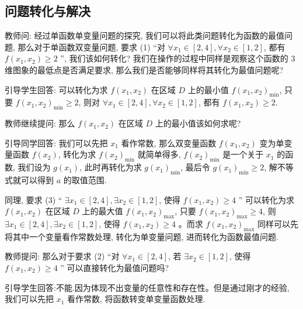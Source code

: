 \subsection{问题转化与解决}
教师问: 经过单函数单变量问题的探究, 我们可以将此类问题转化为函数的最值问题, 那么对于单函数双变量问题, 要求 (1) “对 \(\forall {x}_{1} \in  \left\lbrack  {2, 4}\right\rbrack  , \forall {x}_{2} \in  \left\lbrack  {1, 2}\right\rbrack\), 都有 \(f(x_1, x_2)  \geq  2\) ”, 我们该如何转化? 我们在操作的过程中同样是观察这个函数的 3 维图象的最低点是否满足要求, 那么我们是否能够同样将其转化为最值问题呢?

引导学生回答: 可以转化为求 \(f(x_1, x_2)\) 在区域 \(D\) 上的最小值 \(f{\left( {x}_{1}, {x}_{2}\right) }_{\min }\), 只要 \(f{\left( {x}_{1}, {x}_{2}\right) }_{\min } \geq  2\), 则对 \(\forall {x}_{1} \in  \left\lbrack  {2, 4}\right\rbrack  , \forall {x}_{2} \in  \left\lbrack  {1, 2}\right\rbrack\), 都有 \(f(x_1, x_2)  \geq  2\).

教师继续提问: 那么 \(f(x_1, x_2)\) 在区域 \(D\) 上的最小值该如何求呢?

引导同学回答: 我们可以先把 \({x}_{1}\) 看作常数, 那么双变量函数 \(f(x_1, x_2)\) 变为单变量函数 \(f\left( {x}_{2}\right)\), 转化为求 \(f{\left( {x}_{2}\right) }_{\min }\) 就简单得多, \(f{\left( {x}_{2}\right) }_{\min }\) 是一个关于 \({x}_{1}\) 的函数, 我们设为 \(g\left( {x}_{1}\right)\), 此时再转化为求 \(g{\left( {x}_{1}\right) }_{\min }\), 最后令 \(g{\left( {x}_{1}\right) }_{\min } \geq  2\), 解不等式就可以得到 \(a\) 的取值范围.

同理, 要求 (3) “ \(\exists {x}_{1} \in  \left\lbrack  {2, 4}\right\rbrack  , \exists {x}_{2} \in  \left\lbrack  {1, 2}\right\rbrack\), 使得 \(f(x_1, x_2)  \geq  4\) ” 可以转化为求 \(f(x_1, x_2)\) 在区域 \(D\) 上的最大值 \(f{\left( {x}_{1}, {x}_{2}\right) }_{\max }\), 只要 \(f{\left( {x}_{1}, {x}_{2}\right) }_{\max } \geq  4\), 则 \(\exists {x}_{1} \in \left\lbrack  {2, 4}\right\rbrack  , \exists {x}_{2} \in  \left\lbrack  {1, 2}\right\rbrack\), 使得 \(f(x_1, x_2)  \geq  4\) 。而求 \(f{\left( {x}_{1}, {x}_{2}\right) }_{\max }\) 同样可以先将其中一个变量看作常数处理, 转化为单变量问题, 进而转化为函数最值问题.

教师提问: 那么对于要求 (2) “对 \(\forall {x}_{1} \in  \left\lbrack  {2, 4}\right\rbrack\), 若 \(\exists {x}_{2} \in  \left\lbrack  {1, 2}\right\rbrack\), 使得 \(f(x_1, x_2)  \geq  4\) ” 可以直接转化为最值问题吗?

引导学生回答:不能.因为体现不出变量的任意性和存在性。但是通过刚才的经验, 我们可以先把 \({x}_{1}\) 看作常数, 将函数转变单变量函数处理.

